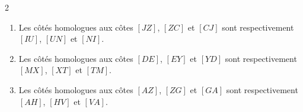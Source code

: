 \begin{exercice*}
\begin{enumerate}
\begin{tikzpicture}[baseline,scale = 0.3]
            \end{tikzpicture}
        \end{enumerate}

\end{exercice*}
\begin{corrige}
    \phantom{rrr}    
    \begin{multicols}2
        \begin{enumerate}
            \item Les côtés homologues aux côtes $[JZ]$, $[ZC]$ et $[CJ]$ sont respectivement 
            $[IU]$, $[UN]$ et $[NI]$.
            \item Les côtés homologues aux côtes $[DE]$, $[EY]$ et $[YD]$ sont respectivement 
            $[MX]$, $[XT]$ et $[TM]$.
            \columnbreak
            \item Les côtés homologues aux côtes $[AZ]$, $[ZG]$ et $[GA]$ sont respectivement 
            $[AH]$, $[HV]$ et $[VA]$.
        \end{enumerate}
    \end{multicols}
\end{corrige}

